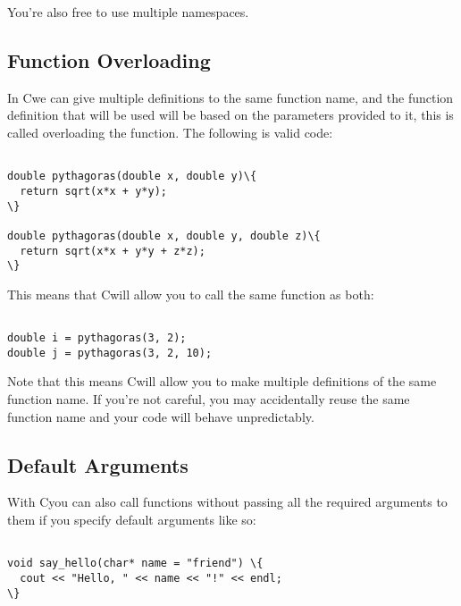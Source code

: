 \documentclass{IEEEtran}
\newcommand{\cpp}{C\nolinebreak\hspace{-.05em}\raisebox{.15ex}{\small\bf +}\nolinebreak\hspace{-.10em}\raisebox{.15ex}{\small\bf+\ }}
\begin{document}
You're also free to use multiple namespaces.


\subsection{Function Overloading}

In \cpp we can give multiple definitions to  the same function name, and the function definition that will be used will be based on the parameters provided to it, this is called overloading the function. The following is valid code:

\begin{Verbatim}[fontsize=\scriptsize, xleftmargin=.3in, commandchars=\\\{\}]
          
double pythagoras(double x, double y)\{
  return sqrt(x*x + y*y);
\}

double pythagoras(double x, double y, double z)\{
  return sqrt(x*x + y*y + z*z);
\}

\end{Verbatim}

This means that \cpp will allow you to call the same function as both: 

\begin{Verbatim}[fontsize=\scriptsize, xleftmargin=.3in, commandchars=\\\{\}]
          
double i = pythagoras(3, 2);
double j = pythagoras(3, 2, 10);

\end{Verbatim}

Note that this means \cpp will allow you to make multiple definitions of the same function name. If you're not careful, you may accidentally reuse the same function name and your code will behave unpredictably.

\subsection{Default Arguments}

With \cpp you can also call functions without passing all the required arguments to them if you specify default arguments like so:


\begin{Verbatim}[fontsize=\scriptsize, xleftmargin=.3in, commandchars=\\\{\}]
          
void say_hello(char* name = "friend") \{
  cout << "Hello, " << name << "!" << endl;
\}

\end{Verbatim}
\end{document}
